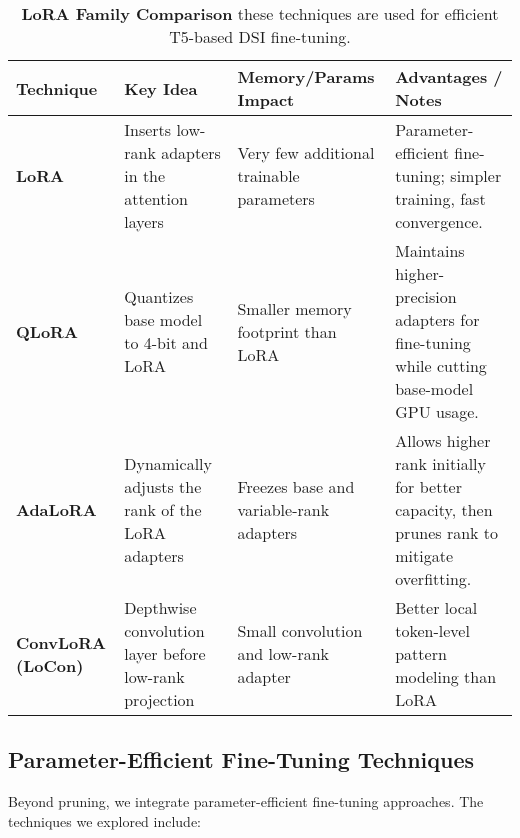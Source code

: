 \begin{table*}[h]
    \centering
    \begin{tabular}{p{2.1cm}p{2.8cm}p{3.0cm}p{5.5cm}}
    \toprule
    \textbf{Technique} & \textbf{Key Idea} & \textbf{Memory/Params Impact} & \textbf{Advantages / Notes} \\
    \midrule
    
    \textbf{LoRA} 
    & Inserts low-rank adapters in the attention layers
    & Very few additional trainable parameters 
    & Parameter-efficient fine-tuning; simpler training, fast convergence. \\
    
    \textbf{QLoRA} 
    & Quantizes base model to 4-bit and LoRA
    & Smaller memory footprint than LoRA 
    & Maintains higher-precision adapters for fine-tuning while cutting base-model GPU usage. \\
    
    \textbf{AdaLoRA} 
    & Dynamically adjusts the rank of the LoRA adapters 
    & Freezes base  and variable-rank adapters 
    & Allows higher rank initially for better capacity, then prunes rank to mitigate overfitting.  \\
    
    \textbf{ConvLoRA (LoCon)} 
    & Depthwise convolution layer before low-rank projection 
    & Small convolution and low-rank adapter 
    & Better local token-level pattern modeling than LoRA \\
    \bottomrule
    \end{tabular}
    \caption{\textbf{LoRA Family Comparison} these techniques are used for efficient T5-based DSI fine-tuning.}
    \label{tab:comparison}
    \end{table*}

\subsection{Parameter-Efficient Fine-Tuning Techniques}
Beyond pruning, we integrate parameter-efficient fine-tuning approaches. The techniques we explored include:

